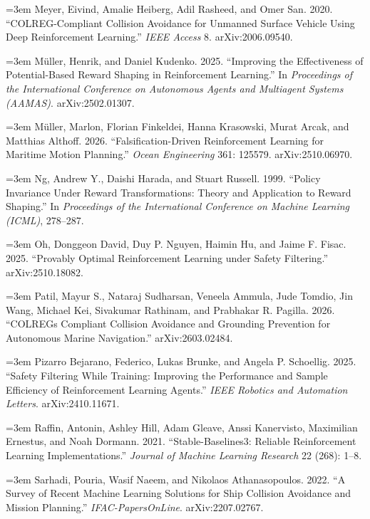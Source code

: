 \documentclass[12pt,letterpaper]{article}
\newcommand{\refitem}[1]{\par\begingroup\emergencystretch=3em\sloppy\noindent\hangindent=0.5in\hangafter=1 #1\par\endgroup}
\begin{document}
\refitem{\hypertarget{ref:meyer2020}{}Meyer, Eivind, Amalie Heiberg, Adil Rasheed, and Omer San. 2020. ``COLREG-Compliant Collision Avoidance for Unmanned Surface Vehicle Using Deep Reinforcement Learning.'' \textit{IEEE Access} 8. arXiv:2006.09540.}

\refitem{\hypertarget{ref:mller2025}{}Müller, Henrik, and Daniel Kudenko. 2025. ``Improving the Effectiveness of Potential-Based Reward Shaping in Reinforcement Learning.'' In \textit{Proceedings of the International Conference on Autonomous Agents and Multiagent Systems (AAMAS)}. arXiv:2502.01307.}

\refitem{\hypertarget{ref:mller2026}{}Müller, Marlon, Florian Finkeldei, Hanna Krasowski, Murat Arcak, and Matthias Althoff. 2026. ``Falsification-Driven Reinforcement Learning for Maritime Motion Planning.'' \textit{Ocean Engineering} 361: 125579. arXiv:2510.06970.}

\refitem{\hypertarget{ref:ng1999}{}Ng, Andrew Y., Daishi Harada, and Stuart Russell. 1999. ``Policy Invariance Under Reward Transformations: Theory and Application to Reward Shaping.'' In \textit{Proceedings of the International Conference on Machine Learning (ICML)}, 278--287.}

\refitem{\hypertarget{ref:oh2025}{}Oh, Donggeon David, Duy P. Nguyen, Haimin Hu, and Jaime F. Fisac. 2025. ``Provably Optimal Reinforcement Learning under Safety Filtering.'' arXiv:2510.18082.}

\refitem{\hypertarget{ref:patil2026}{}Patil, Mayur S., Nataraj Sudharsan, Veneela Ammula, Jude Tomdio, Jin Wang, Michael Kei, Sivakumar Rathinam, and Prabhakar R. Pagilla. 2026. ``COLREGs Compliant Collision Avoidance and Grounding Prevention for Autonomous Marine Navigation.'' arXiv:2603.02484.}

\refitem{\hypertarget{ref:pizarro2025}{}Pizarro Bejarano, Federico, Lukas Brunke, and Angela P. Schoellig. 2025. ``Safety Filtering While Training: Improving the Performance and Sample Efficiency of Reinforcement Learning Agents.'' \textit{IEEE Robotics and Automation Letters}. arXiv:2410.11671.}

\refitem{\hypertarget{ref:raffin2021}{}Raffin, Antonin, Ashley Hill, Adam Gleave, Anssi Kanervisto, Maximilian Ernestus, and Noah Dormann. 2021. ``Stable-Baselines3: Reliable Reinforcement Learning Implementations.'' \textit{Journal of Machine Learning Research} 22 (268): 1--8.}

\refitem{\hypertarget{ref:sarhadi2022}{}Sarhadi, Pouria, Wasif Naeem, and Nikolaos Athanasopoulos. 2022. ``A Survey of Recent Machine Learning Solutions for Ship Collision Avoidance and Mission Planning.'' \textit{IFAC-PapersOnLine}. arXiv:2207.02767.}
\end{document}
